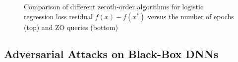 \documentclass{article}
\theoremstyle{definition}
\theoremstyle{remark}
\begin{document}
\begin{figure}[htbp]
%
%
\setlength{\abovecaptionskip}{2pt}
\caption{Comparison of different zeroth-order algorithms for logistic regression loss residual $f(x) - f(x^*)$ versus the number of epochs (top) and ZO queries (bottom)}
\label{fig:algo_comp}
\end{figure}


\subsection{Adversarial Attacks on Black-Box DNNs}
\end{document}
